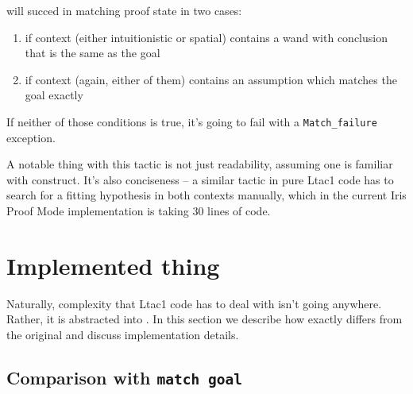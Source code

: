  will succed in matching proof state in two cases:
\begin{enumerate}
\item if context (either intuitionistic or spatial) contains a wand with conclusion that is the same as the goal
\item if context (again, either of them) contains an assumption which matches the goal exactly
\end{enumerate}

If neither of those conditions is true, it's going to fail with a {\color{red} \texttt{Match\_failure}} exception.

A notable thing with this tactic is not just readability, assuming one is familiar with  construct.
It's also conciseness -- a similar tactic in pure Ltac1 code has to search for a fitting hypothesis in both contexts manually, which in the current Iris Proof Mode implementation is taking 30 lines of code.

\section{Implemented thing}

Naturally, complexity that Ltac1 code has to deal with isn't going anywhere.
Rather, it is abstracted into .
In this section we describe how exactly  differs from the original  and discuss implementation details.

\subsection{Comparison with \texttt{match goal}}

